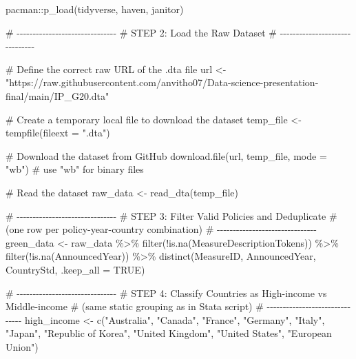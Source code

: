 \documentclass[
  letterpaper,
  DIV=11,
  numbers=noendperiod]{scrartcl}
\newenvironment{Shaded}{\begin{snugshade}}{\end{snugshade}}
\newcommand{\AttributeTok}[1]{\textcolor[rgb]{0.40,0.45,0.13}{#1}}
\newcommand{\CommentTok}[1]{\textcolor[rgb]{0.37,0.37,0.37}{#1}}
\newcommand{\ConstantTok}[1]{\textcolor[rgb]{0.56,0.35,0.01}{#1}}
\newcommand{\FunctionTok}[1]{\textcolor[rgb]{0.28,0.35,0.67}{#1}}
\newcommand{\NormalTok}[1]{\textcolor[rgb]{0.00,0.23,0.31}{#1}}
\newcommand{\OtherTok}[1]{\textcolor[rgb]{0.00,0.23,0.31}{#1}}
\newcommand{\SpecialCharTok}[1]{\textcolor[rgb]{0.37,0.37,0.37}{#1}}
\newcommand{\StringTok}[1]{\textcolor[rgb]{0.13,0.47,0.30}{#1}}
\begin{document}
\begin{Shaded}
\begin{Highlighting}[]
\NormalTok{pacman}\SpecialCharTok{::}\FunctionTok{p\_load}\NormalTok{(tidyverse, haven, janitor)}

\CommentTok{\# {-}{-}{-}{-}{-}{-}{-}{-}{-}{-}{-}{-}{-}{-}{-}{-}{-}{-}{-}{-}{-}{-}{-}{-}{-}{-}{-}{-}{-}{-}{-}}
\CommentTok{\# STEP 2: Load the Raw Dataset}
\CommentTok{\# {-}{-}{-}{-}{-}{-}{-}{-}{-}{-}{-}{-}{-}{-}{-}{-}{-}{-}{-}{-}{-}{-}{-}{-}{-}{-}{-}{-}{-}{-}{-}}

\CommentTok{\# Define the correct raw URL of the .dta file}
\NormalTok{url }\OtherTok{\textless{}{-}} \StringTok{"https://raw.githubusercontent.com/anvitho07/Data{-}science{-}presentation{-}final/main/IP\_G20.dta"}

\CommentTok{\# Create a temporary local file to download the dataset}
\NormalTok{temp\_file }\OtherTok{\textless{}{-}} \FunctionTok{tempfile}\NormalTok{(}\AttributeTok{fileext =} \StringTok{".dta"}\NormalTok{)}

\CommentTok{\# Download the dataset from GitHub}
\FunctionTok{download.file}\NormalTok{(url, temp\_file, }\AttributeTok{mode =} \StringTok{"wb"}\NormalTok{)  }\CommentTok{\# use "wb" for binary files}

\CommentTok{\# Read the dataset}
\NormalTok{raw\_data }\OtherTok{\textless{}{-}} \FunctionTok{read\_dta}\NormalTok{(temp\_file)}

\CommentTok{\# {-}{-}{-}{-}{-}{-}{-}{-}{-}{-}{-}{-}{-}{-}{-}{-}{-}{-}{-}{-}{-}{-}{-}{-}{-}{-}{-}{-}{-}{-}{-}}
\CommentTok{\# STEP 3: Filter Valid Policies and Deduplicate}
\CommentTok{\#         (one row per policy{-}year{-}country combination)}
\CommentTok{\# {-}{-}{-}{-}{-}{-}{-}{-}{-}{-}{-}{-}{-}{-}{-}{-}{-}{-}{-}{-}{-}{-}{-}{-}{-}{-}{-}{-}{-}{-}{-}}
\NormalTok{green\_data }\OtherTok{\textless{}{-}}\NormalTok{ raw\_data }\SpecialCharTok{\%\textgreater{}\%}
  \FunctionTok{filter}\NormalTok{(}\SpecialCharTok{!}\FunctionTok{is.na}\NormalTok{(MeasureDescriptionTokens)) }\SpecialCharTok{\%\textgreater{}\%}
  \FunctionTok{filter}\NormalTok{(}\SpecialCharTok{!}\FunctionTok{is.na}\NormalTok{(AnnouncedYear)) }\SpecialCharTok{\%\textgreater{}\%}
  \FunctionTok{distinct}\NormalTok{(MeasureID, AnnouncedYear, CountryStd, }\AttributeTok{.keep\_all =} \ConstantTok{TRUE}\NormalTok{)}

\CommentTok{\# {-}{-}{-}{-}{-}{-}{-}{-}{-}{-}{-}{-}{-}{-}{-}{-}{-}{-}{-}{-}{-}{-}{-}{-}{-}{-}{-}{-}{-}{-}{-}}
\CommentTok{\# STEP 4: Classify Countries as High{-}income vs Middle{-}income}
\CommentTok{\#         (same static grouping as in Stata script)}
\CommentTok{\# {-}{-}{-}{-}{-}{-}{-}{-}{-}{-}{-}{-}{-}{-}{-}{-}{-}{-}{-}{-}{-}{-}{-}{-}{-}{-}{-}{-}{-}{-}{-}}
\NormalTok{high\_income }\OtherTok{\textless{}{-}} \FunctionTok{c}\NormalTok{(}\StringTok{"Australia"}\NormalTok{, }\StringTok{"Canada"}\NormalTok{, }\StringTok{"France"}\NormalTok{, }\StringTok{"Germany"}\NormalTok{, }\StringTok{"Italy"}\NormalTok{, }\StringTok{"Japan"}\NormalTok{,}
                 \StringTok{"Republic of Korea"}\NormalTok{, }\StringTok{"United Kingdom"}\NormalTok{, }\StringTok{"United States"}\NormalTok{, }\StringTok{"European Union"}\NormalTok{)}


\end{Highlighting}
\end{Shaded}
\end{document}
